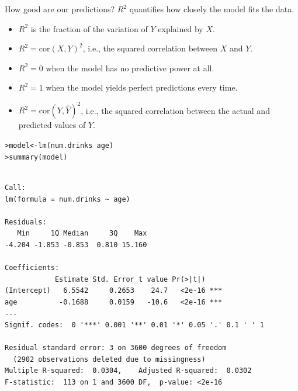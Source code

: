 \documentclass{beamer}\usepackage[]{graphicx}\usepackage[]{color}
\makeatletter
\newcommand{\hlopt}[1]{\textcolor[rgb]{1,0.894,0.769}{#1}}%
\newcommand{\hlstd}[1]{\textcolor[rgb]{1,0.894,0.769}{#1}}%
\newcommand{\hlkwb}[1]{\textcolor[rgb]{0.804,0.776,0.451}{#1}}%
\newcommand{\hlkwd}[1]{\textcolor[rgb]{1,0.78,0.769}{#1}}%
\newenvironment{kframe}{%
 \def\at@end@of@kframe{}%
 \ifinner\ifhmode%
  \def\at@end@of@kframe{\end{minipage}}%
  \begin{minipage}{\columnwidth}%
 \fi\fi%
 \def\FrameCommand##1{\hskip\@totalleftmargin \hskip-\fboxsep
 \colorbox{shadecolor}{##1}\hskip-\fboxsep
     \hskip-\linewidth \hskip-\@totalleftmargin \hskip\columnwidth}%
 \MakeFramed {\advance\hsize-\width
   \@totalleftmargin\z@ \linewidth\hsize
   \@setminipage}}%
 {\par\unskip\endMakeFramed%
 \at@end@of@kframe}
\newenvironment{knitrout}{}{} %
\makeatother
\begin{document}
\begin{darkframes}
    \begin{frame}{How good are our predictions?}
      $R^2$ quantifies how closely the model fits the data.
      \begin{itemize}[<+->]
        \item $R^2$ is the fraction of the variation of $Y$ explained by $X$.
        \item $R^2=\text{cor}(X,Y)^2$, i.e., the squared correlation between $X$ and $Y$.
        \item $R^2=0$ when the model has no predictive power at all.
        \item $R^2=1$ when the model yields perfect predictions every time.
        \item $R^2=\text{cor}(Y,\hat Y)^2$, i.e., the squared correlation between the actual and predicted values of $Y$.
      \end{itemize}
    \end{frame}

    \begin{frame}[fragile]
      \fontsize{9}{9}\selectfont
\begin{knitrout}
\begin{kframe}
\begin{alltt}
\hlstd{> }\hlstd{model} \hlkwb{<-} \hlkwd{lm}\hlstd{(num.drinks} \hlopt{~} \hlstd{age)}
\hlstd{> }\hlkwd{summary}\hlstd{(model)}
\end{alltt}
\begin{verbatim}

Call:
lm(formula = num.drinks ~ age)

Residuals:
   Min     1Q Median     3Q    Max 
-4.204 -1.853 -0.853  0.810 15.160 

Coefficients:
            Estimate Std. Error t value Pr(>|t|)    
(Intercept)   6.5542     0.2653    24.7   <2e-16 ***
age          -0.1688     0.0159   -10.6   <2e-16 ***
---
Signif. codes:  0 '***' 0.001 '**' 0.01 '*' 0.05 '.' 0.1 ' ' 1

Residual standard error: 3 on 3600 degrees of freedom
  (2902 observations deleted due to missingness)
Multiple R-squared:  0.0304,	Adjusted R-squared:  0.0302 
F-statistic:  113 on 1 and 3600 DF,  p-value: <2e-16
\end{verbatim}
\end{kframe}
\end{knitrout}
    \end{frame}


\end{darkframes}
\end{document}
